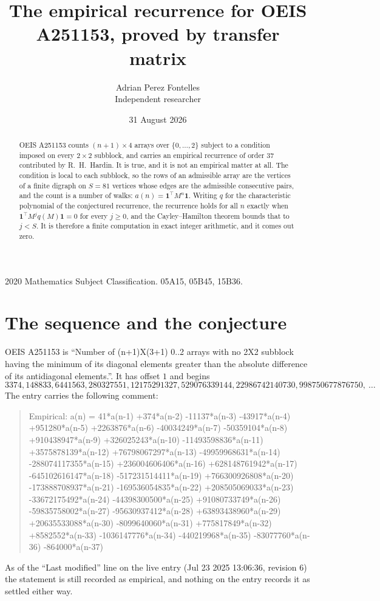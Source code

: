 \documentclass[11pt,a4paper]{article}
\title{The empirical recurrence for OEIS A251153, proved by transfer matrix}
\author{Adrian Perez Fontelles\\ \small Independent researcher}
\date{31 August 2026}
\theoremstyle{plain}
\theoremstyle{definition}
\begin{document}
\maketitle

\begin{abstract}
OEIS A251153 counts $(n+1)\times4$ arrays over $\{0,\dots,2\}$ subject to a condition imposed on
every $2\times2$ subblock, and carries an empirical recurrence of order $37$ contributed
by R.~H.~Hardin. It is true, and it is not an empirical matter at all. The condition is local
to each subblock, so the rows of an admissible array are the vertices of a finite digraph
on $S=81$ vertices whose edges are the admissible consecutive pairs, and the count is a
number of walks: $a(n)=\mathbf{1}^{\!\top}M^{n}\mathbf{1}$. Writing $q$
for the characteristic polynomial of the conjectured recurrence, the recurrence holds for all
$n$ exactly when $\mathbf{1}^{\!\top}M^{j}q(M)\mathbf{1}=0$ for every $j\ge0$, and the
Cayley--Hamilton theorem bounds that to $j<S$. It is therefore a finite computation in exact
integer arithmetic, and it comes out zero.
\end{abstract}

\noindent\small 2020 Mathematics Subject Classification. 05A15, 05B45, 15B36.\normalsize

\section{The sequence and the conjecture}

OEIS A251153 is ``Number of (n+1)X(3+1) 0..2 arrays with no 2X2 subblock having the minimum of its diagonal elements greater than the absolute difference of its antidiagonal elements.''. It has offset $1$ and begins
\[
3374, 148833, 6441563, 280327551, 12175291327, 529076339144, 22986742140730, 998750677876750,\ \dots
\]
The entry carries the following comment:
\begin{quote}\small
Empirical: a(n) = 41*a(n-1) +374*a(n-2) -11137*a(n-3) -43917*a(n-4) +951280*a(n-5) +2263876*a(n-6) -40034249*a(n-7) -50359104*a(n-8) +910438947*a(n-9) +326025243*a(n-10) -11493598836*a(n-11) +3575878139*a(n-12) +76798067297*a(n-13) -49959968631*a(n-14) -288074117355*a(n-15) +236004606406*a(n-16) +628148761942*a(n-17) -645102616147*a(n-18) -517231514411*a(n-19) +766300926808*a(n-20) -173888708937*a(n-21) -169536054835*a(n-22) +208505069033*a(n-23) -33672175492*a(n-24) -44398300500*a(n-25) +91080733749*a(n-26) -59835758002*a(n-27) -95630937412*a(n-28) +63893438960*a(n-29) +20635533088*a(n-30) -8099640060*a(n-31) +775817849*a(n-32) +8582552*a(n-33) -1036147776*a(n-34) -440219968*a(n-35) -83077760*a(n-36) -864000*a(n-37)
\end{quote}
As of the ``Last modified'' line on the live entry (Jul 23 2025 13:06:36, revision 6) the statement is
still recorded as empirical, and nothing on the entry records it as settled either way.
\end{document}
